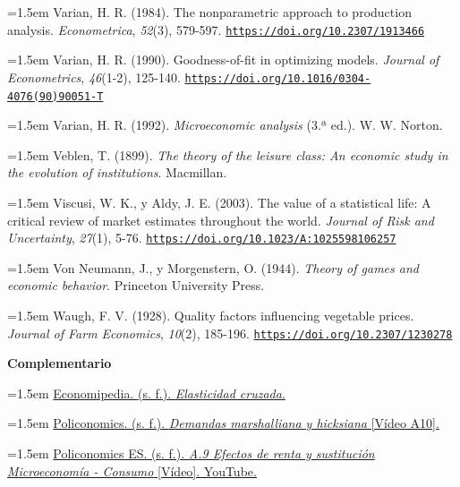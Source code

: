 \documentclass[10pt,a4paper]{article}
\begin{document}
\noindent\hangindent=1.5em Varian, H. R. (1984). The nonparametric approach to production analysis. \textit{Econometrica}, \textit{52}(3), 579-597. \href{https://doi.org/10.2307/1913466}{\nolinkurl{https://doi.org/10.2307/1913466}}

{\sloppy\noindent\hangindent=1.5em Varian, H. R. (1990). Goodness-of-fit in optimizing models. \textit{Journal of Econometrics}, \textit{46}(1-2), 125-140. \href{https://doi.org/10.1016/0304-4076(90)90051-T}{\nolinkurl{https://doi.org/10.1016/0304-4076(90)90051-T}}\par}

\noindent\hangindent=1.5em Varian, H. R. (1992). \textit{Microeconomic analysis} (3.ª ed.). W. W. Norton.

\noindent\hangindent=1.5em Veblen, T. (1899). \textit{The theory of the leisure class: An economic study in the evolution of institutions}. Macmillan.

\noindent\hangindent=1.5em Viscusi, W. K., y Aldy, J. E. (2003). The value of a statistical life: A critical review of market estimates throughout the world. \textit{Journal of Risk and Uncertainty}, \textit{27}(1), 5-76. \href{https://doi.org/10.1023/A:1025598106257}{\nolinkurl{https://doi.org/10.1023/A:1025598106257}}

\noindent\hangindent=1.5em Von Neumann, J., y Morgenstern, O. (1944). \textit{Theory of games and economic behavior}. Princeton University Press.

\noindent\hangindent=1.5em Waugh, F. V. (1928). Quality factors influencing vegetable prices. \textit{Journal of Farm Economics}, \textit{10}(2), 185-196. \href{https://doi.org/10.2307/1230278}{\nolinkurl{https://doi.org/10.2307/1230278}}

\textbf{Complementario}

\noindent\hangindent=1.5em \href{https://economipedia.com/definiciones/elasticidad-cruzada.html}{Economipedia. (s. f.). \textit{Elasticidad cruzada}.}

\noindent\hangindent=1.5em \href{https://policonomics.com/es/video-a10-demandas-marshalliana-hicksiana/}{Policonomics. (s. f.). \textit{Demandas marshalliana y hicksiana} [Vídeo A10].}

\noindent\hangindent=1.5em \href{https://www.youtube.com/watch?v=J0PSPX2B5FI}{Policonomics ES. (s. f.). \textit{A.9 Efectos de renta y sustitución \textbar{} Microeconomía - Consumo} [Vídeo]. YouTube.}
\end{document}
